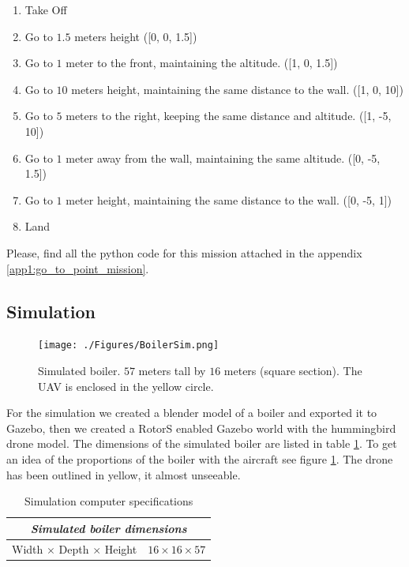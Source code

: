     \begin{enumerate}
      \item Take Off
      \item Go to $1.5$ meters height ([0, 0, 1.5])
      \item Go to $1$ meter to the front, maintaining the altitude. ([1, 0, 1.5])
      \item Go to $10$ meters height, maintaining the same distance to the wall. ([1, 0, 10])
      \item Go to $5$ meters to the right, keeping the same distance and altitude. ([1, -5, 10])
      \item Go to $1$ meter away from the wall, maintaining the same altitude. ([0, -5, 1.5])
      \item Go to $1$ meter height, maintaining the same distance to the wall. ([0, -5, 1])
      \item Land
    \end{enumerate}

    Please, find all the python code for this mission attached in the appendix \ref{app1:go_to_point_mission}.

  \subsection{Simulation} \label{ch_5:subsect:exp_simulation}

    \begin{figure}[!h]
      \centering
      \texttt{[image: ./Figures/BoilerSim.png]}
      \caption{Simulated boiler. $57$ meters tall by $16$ meters (square section). The UAV is enclosed in the yellow circle.}
      \label{ch_5:fig:boiler_sim}
    \end{figure}

    For the simulation we created a blender model of a boiler and exported it to Gazebo, then we created a RotorS enabled Gazebo world with the hummingbird drone model. The dimensions of the simulated boiler are listed in table \ref{ch_5:table:boiler_sim_dims}. To get an idea of the proportions of the boiler with the aircraft see figure \ref{ch_5:fig:boiler_sim}. The drone has been outlined in yellow, it almost unseeable.

    \begin{table}[!h]
      \centering
      \begin{tabular}{lr} \toprule
        \multicolumn{2}{c}{\textit{Simulated boiler dimensions}}        \\ \midrule
        Width $\times$ Depth $\times$ Height & $16 \times 16 \times 57$ \\ \bottomrule
        \hline
      \end{tabular}
      \caption{Simulation computer specifications}
      \label{ch_5:table:boiler_sim_dims}
    \end{table}

